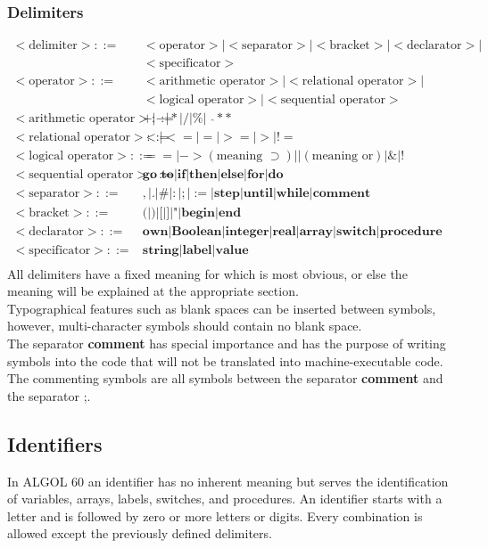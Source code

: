 \documentclass{article}
\begin{document}
\subsubsection{Delimiters}
\begin{equation} \label{eq5}
\begin{split}
<\text{delimiter}> ::=&<\text{operator}>|<\text{separator}>|<\text{bracket}>|<\text{declarator}>|\\&<\text{specificator}> \\
<\text{operator}> ::=&<\text{arithmetic operator}>|<\text{relational operator}>|\\&<\text{logical operator}>|<\text{sequential operator}> \\
<\text{arithmetic operator}> ::=&+|-|*|/|\%|\text{ }\hat{} \ast \ast \\
<\text{relational operator}> ::=&<|<=|=|>=|>|!= \\
<\text{logical operator}> ::=&==|->(\text{meaning }\supset)||(\text{meaning or})|\&|!\\
<\text{sequential operator}> ::=&\textbf{go to}|\textbf{if}|\textbf{then}|\textbf{else}|\textbf{for}|\textbf{do}\\
<\text{separator}> ::=&,|.|\#|:|;|:=|\textbf{step}|\textbf{until}|\textbf{while}|\textbf{comment}\\
<\text{bracket}> ::=&\text{(}|\text{)}|\text{[}|\text{]}|\text{"}|\textbf{begin}|\textbf{end}\\
<\text{declarator}> ::=&\textbf{own}|\textbf{Boolean}|\textbf{integer}|\textbf{real}|\textbf{array}|\textbf{switch}|\textbf{procedure}\\
<\text{specificator}> ::=&\textbf{string}|\textbf{label}|\textbf{value}\\
\end{split}
\end{equation}
All delimiters have a fixed meaning for which is most obvious, or else the meaning will be explained at the appropriate section.\\
Typographical features such as blank spaces can be inserted between symbols, however, multi-character symbols should contain no blank space.\\
The separator \textbf{comment} has special importance and has the purpose of writing symbols into the code that will not be translated into machine-executable code. The commenting symbols are all symbols between the separator \textbf{comment} and the separator ;.

\subsection{Identifiers}
In ALGOL 60 an identifier has no inherent meaning but serves the identification of variables, arrays, labels, switches, and procedures. An identifier starts with a letter and is followed by zero or more letters or digits. Every combination is allowed except the previously defined delimiters.\\ 
\end{document}
